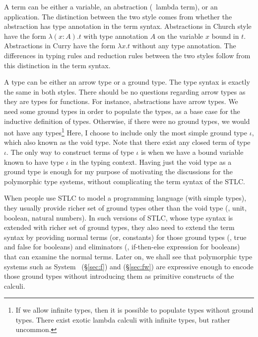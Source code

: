 A term can be either a variable, an abstraction (\aka\ lambda term), or
an application. The distinction between the two style comes from whether
the abstraction has type annotation in the term syntax. Abstractions in
Church style have the form $\lambda(x:A).t$ with type annotation $A$ on
the variable $x$ bound in $t$. Abstractions in Curry have the form
$\lambda x.t$ without any type annotation. The differences in typing rules
and reduction rules between the two styles follow from this distinction
in the term syntax.

A type can be either an arrow type or a ground type.
The type syntax is exactly the same in both styles.
There should be no questions regarding arrow types as they are types for
functions. For instance, abstractions have arrow types. We need some
ground types in order to populate the types, as a base case for
the inductive definition of types. Otherwise, if there were no ground types,
we would not have any types\footnote{If we allow infinite types, then it is
	possible to populate types without ground types. There exist exotic
	lambda calculi with infinite types, but rather uncommon.}
Here, I choose to include only the most simple ground type $\iota$,
which also known as the void type. Note that there exist any closed term of
type $\iota$. The only way to construct terms of type $\iota$ is when we
have a bound variable known to have type $\iota$ in the typing context.
Having just the void type as a ground type is enough for my purpose of
motivating the discussions for the polymorphic type systems, without
complicating the term syntax of the STLC.

When people use STLC to model a programming language (with simple types),
they usually provide richer set of ground types other than the void type
(\eg, unit, boolean, natural numbers). In such versions of STLC, whose
type syntax is extended with richer set of ground types, they also need to
extend the term syntax by providing normal terms (or, constants) for
those ground types (\eg, \textsf{true} and \textsf{false} for booleans) and
eliminators (\eg, if-then-else expression for booleans) that can examine
the normal terms. Later on, we shall see that polymorphic type systems
such as System \F\ (\S\ref{sec:f}) and \Fw (\S\ref{sec:fw}) are expressive
enough to encode those ground types without introducing them as primitive
constructs of the calculi.


